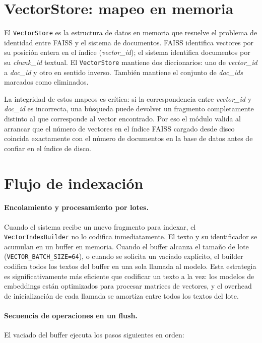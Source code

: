 \documentclass[11pt]{article}
\begin{document}
\section{VectorStore: mapeo en memoria}

El \texttt{VectorStore} es la estructura de datos en memoria que resuelve el problema de
identidad entre FAISS y el sistema de documentos. FAISS identifica vectores por su posición
entera en el índice (\emph{vector\_id}); el sistema identifica documentos por su
\emph{chunk\_id} textual. El \texttt{VectorStore} mantiene dos diccionarios: uno de
\emph{vector\_id} a \emph{doc\_id} y otro en sentido inverso. También mantiene el conjunto
de \emph{doc\_ids} marcados como eliminados.

La integridad de estos mapeos es crítica: si la correspondencia entre \emph{vector\_id} y
\emph{doc\_id} es incorrecta, una búsqueda puede devolver un fragmento completamente distinto
al que corresponde al vector encontrado. Por eso el módulo valida al arrancar que el número
de vectores en el índice FAISS cargado desde disco coincida exactamente con el número de
documentos en la base de datos antes de confiar en el índice de disco.

\section{Flujo de indexación}

\paragraph{Encolamiento y procesamiento por lotes.}
Cuando el sistema recibe un nuevo fragmento para indexar, el \texttt{VectorIndexBuilder}
no lo codifica inmediatamente. El texto y su identificador se acumulan en un buffer en
memoria. Cuando el buffer alcanza el tamaño de lote (\texttt{VECTOR\_BATCH\_SIZE=64}), o
cuando se solicita un vaciado explícito, el builder codifica todos los textos del buffer
en una sola llamada al modelo. Esta estrategia es significativamente más eficiente que
codificar un texto a la vez: los modelos de embeddings están optimizados para procesar
matrices de vectores, y el overhead de inicialización de cada llamada se amortiza entre
todos los textos del lote.

\paragraph{Secuencia de operaciones en un flush.}
El vaciado del buffer ejecuta los pasos siguientes en orden:
\end{document}
